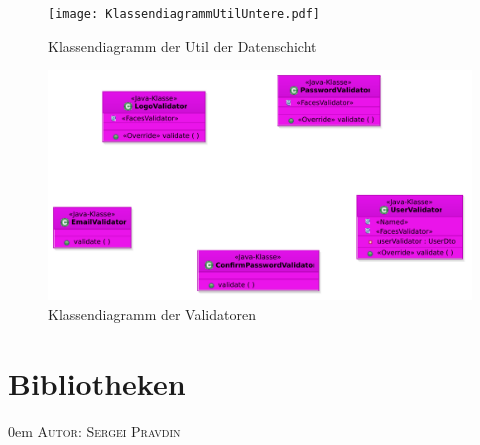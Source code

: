 \documentclass{article}
\makeatletter
\newcommand{\sectionauthor}[1]{
	{\parindent 0em \large \scshape Autor: #1 \par \nobreak \vspace*{1em}}
	\@afterheading
}
\makeatother
\begin{document}
\begin{center}
    \begin{figure}[H]
	\hypertarget{ConfigReader}{}
        \texttt{[image: KlassendiagrammUtilUntere.pdf]}
        \caption{Klassendiagramm der Util der Datenschicht }
        \label{fig:Util-data Klassendiagramm}
    \end{figure}
\end{center}

\begin{center}
    \begin{figure}[H]
	\hypertarget{Validator}{}
        \includegraphics[scale=0.6]{KlassendiagrammValidators.pdf}
        \caption{Klassendiagramm der Validatoren }
        \label{fig:Util-data Klassendiagramm}
    \end{figure}
\end{center}
\restoregeometry
\newpage
\section{Bibliotheken}
\sectionauthor{Sergei Pravdin}

\newenvironment{controls}
{
    \begin{table}[H]
        \centering
        \begin{tabular}{ p{7em} p{19em} p{4em} p{12em} }
            \toprule
            \textbf{Bibliothek} & \textbf{Anwendungsbereich} & \textbf{Version} & \textbf{Lizenz}\\
            \midrule
        }
        {
            \bottomrule
        \end{tabular}
    \end{table}
}
\end{document}
